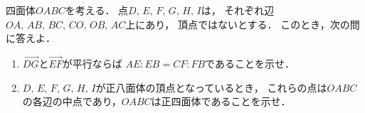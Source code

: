 \documentclass[../../main.tex]{subfiles}
\begin{document}
四面体$OABC$を考える．
点$D, \, E, \, F, \, G, \, H, \, I$は，
それぞれ辺$OA, \, AB, \, BC, \, CO, \, OB, \, AC$上にあり，
頂点ではないとする．
このとき，次の問に答えよ．
\begin{enumerate}
  \item$\overrightarrow{DG}$と$\overrightarrow{EF}$が平行ならば
    $AE:EB=CF:FB$であることを示せ．
  \item$D, \, E, \, F, \, G, \, H, \, I$が正八面体の頂点となっているとき，
    これらの点は$OABC$の各辺の中点であり，$OABC$は正四面体であることを示せ．
\end{enumerate}
\end{document}
